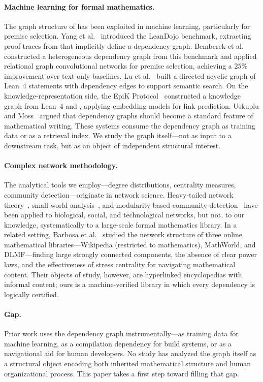 \paragraph{Machine learning for formal mathematics.}
The graph structure of  has been exploited in machine learning, particularly for premise selection. Yang et al.~\cite{leandojo} introduced the LeanDojo benchmark, extracting proof traces from  that implicitly define a dependency graph. Bemberek et al.~\cite{bemberek2025} constructed a heterogeneous dependency graph from this benchmark and applied relational graph convolutional networks for premise selection, achieving a $25\%$ improvement over text-only baselines. Lu et al.~\cite{leanfinder} built a directed acyclic graph of Lean~4 statements with dependency edges to support semantic search. On the knowledge-representation side, the EpiK Protocol~\cite{epik2024} constructed a knowledge graph from Lean~4 and , applying embedding models for link prediction. Uskuplu and Moss~\cite{knowtex2025} argued that dependency graphs should become a standard feature of mathematical writing. These systems consume the dependency graph as training data or as a retrieval index. We study the graph itself---not as input to a downstream task, but as an object of independent structural interest.

\paragraph{Complex network methodology.}
The analytical tools we employ---degree distributions, centrality measures, community detection---originate in network science. Heavy-tailed network theory~\cite{barabasi1999}, small-world analysis~\cite{watts1998}, and modularity-based community detection~\cite{newman2004,blondel2008} have been applied to biological, social, and technological networks, but not, to our knowledge, systematically to a large-scale formal mathematics library. In a related setting, Barbosa et al.~\cite{barbosa2013} studied the network structure of three online mathematical libraries---Wikipedia (restricted to mathematics), MathWorld, and DLMF---finding large strongly connected components, the absence of clear power laws, and the effectiveness of stress centrality for navigating mathematical content. Their objects of study, however, are hyperlinked encyclopedias with informal content; ours is a machine-verified library in which every dependency is logically certified.

\paragraph{Gap.}
Prior work uses the dependency graph instrumentally---as training data for machine learning, as a compilation dependency for build systems, or as a navigational aid for human developers. No study has analyzed the graph itself as a structural object encoding both inherited mathematical structure and human organizational process. This paper takes a first step toward filling that gap.
